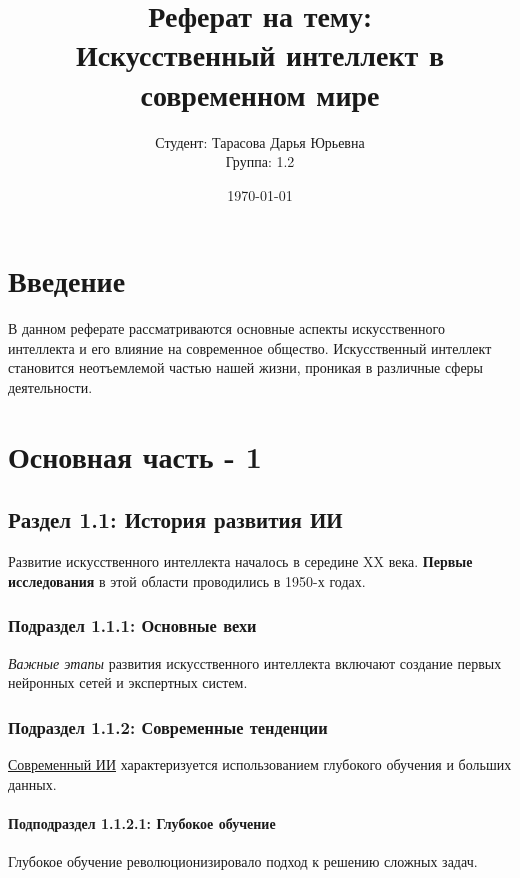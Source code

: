 \documentclass[14pt]{extreport}
\begin{document}
\title{Реферат на тему: \\[0.5cm] \textbf{Искусственный интеллект в современном мире}}
\author{Студент: Тарасова Дарья Юрьевна \\ Группа: 1.2}
\date{\today}
\maketitle

\tableofcontents

\chapter{Введение}
В данном реферате рассматриваются основные аспекты искусственного интеллекта и его влияние на современное общество. Искусственный интеллект становится неотъемлемой частью нашей жизни, проникая в различные сферы деятельности.

\chapter{Основная часть - 1}
\section{Раздел 1.1: История развития ИИ}
Развитие искусственного интеллекта началось в середине XX века. \textbf{Первые исследования} в этой области проводились в 1950-х годах.

\subsection{Подраздел 1.1.1: Основные вехи}
\textit{Важные этапы} развития искусственного интеллекта включают создание первых нейронных сетей и экспертных систем.

\subsection{Подраздел 1.1.2: Современные тенденции}
\underline{Современный ИИ} характеризуется использованием глубокого обучения и больших данных.

\subsubsection{Подподраздел 1.1.2.1: Глубокое обучение}
Глубокое обучение революционизировало подход к решению сложных задач.
\end{document}
